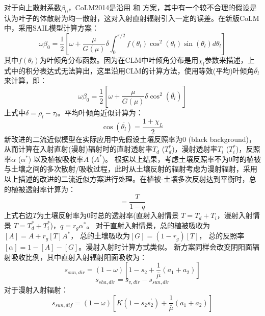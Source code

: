 对于向上散射系数$\beta_0$，CoLM2014是沿用 \citet{dickinson1983land} 和 \citet{sellers1985canopy} 方案，其中有一个较不合理的假设是认为叶子的体散射为均一散射，这对入射直射辐射引入一定的误差。在新版CoLM中，采用SAIL模型计算方案：
\begin{equation}
\omega \beta_{0}=\frac{1}{2}\left[\omega+\frac{\mu}{G(\mu)} \delta \int_{0}^{\pi / 2} 
f\left(\theta_{l}\right) \cos ^{2}\left(\theta_{l}\right) \sin \left(\theta_{l}\right) d \theta_{l}\right]
\end{equation}
其中$f\left(\theta_l\right)$为叶倾角分布函数。因为在CLM中叶倾角分布是用$\chi_l$参数来描述，上式中的积分表达式无法算出，这里沿用CLM的计算方法，使用等效(平均)叶倾角$\bar{\theta_l}$来计算，即：
\begin{equation}
\omega \beta_{0}=\frac{1}{2}\left[\omega+\frac{\mu}{G(\mu)} \delta \cos ^{2}\left(\overline{\theta_{l}}\right)\right]
\end{equation}
上式中$\delta=\rho_l-\tau_l$。平均叶倾角近似计算为：
\begin{equation}
\cos \left(\overline{\theta_{l}}\right)=\frac{1+\chi_{L}}{2}
\end{equation}
新改进的二流近似模型在实际应用中先假设土壤反照率为0 (black background)，从而计算在入射直射(漫射)辐射时的直射透射率$T_d$ ($T_d^\ast$)，漫射透射率$T_i$ ($T_i^\ast$)，反照率$\alpha$ ($\alpha^\ast$) 以及植被吸收率$A$ ($A^\ast$)。
根据以上结果，考虑土壤反照率不为0时的植被与土壤之间的多次散射/吸收过程，此时从土壤反射的辐射考虑为漫射辐射，采用以上描述的改进的二流近似方案进行处理。在植被-土壤多次反射达到平衡时，总的植被透射率计算为：
\begin{equation}
[T]=\frac{T}{1-q}
\end{equation}
上式右边$T$为土壤反射率为0时总的透射率(直射入射情景 $T=T_d+T_i$，漫射入射情景 $T=T_d^\ast+T_i^\ast$)，$q=r_g\alpha^\ast$。
对于直射入射情景，总的植被吸收为$\left[A\right]=A+r_g\left[T\right]A^\ast$，
总的土壤吸收为$\left[G\right]=\left(1-r_g\right)\left[T\right]$，
总的反照率$\left[\alpha\right]=1-\left[A\right]-\left[G\right]$。漫射入射时计算方式类似。
新方案同样会改变阴阳面辐射吸收比例，其中直射入射辐射阳面吸收为：
\begin{equation}
s_{sun,dir}=(1-\omega)\left[1-s_{2}+\frac{1}{\bar{\mu}}\left(a_{1}+a_{2}\right)\right]
\end{equation}
\begin{equation}
s_{sha,dir}=s_{v,dir}-s_{sun,dir}
\end{equation}
对于漫射入射辐射：
\begin{equation}
s_{sun,dif}=(1-\omega)\left[K\left(1-s_{2} s_{2}^{\prime}\right)+\frac{1}{\bar{\mu}}\left(a_{1}+a_{2}\right)\right]
\end{equation}
